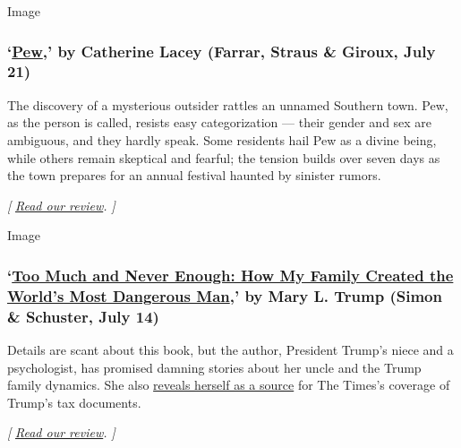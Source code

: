 Image

\hypertarget{pew-by-catherine-lacey-farrar-straus--giroux-july-21}{%
\subsubsection{\texorpdfstring{`\href{https://us.macmillan.com/books/9780374230920}{Pew},'
by Catherine Lacey (Farrar, Straus \& Giroux, July
21)}{`Pew,' by Catherine Lacey (Farrar, Straus \& Giroux, July 21)}}\label{pew-by-catherine-lacey-farrar-straus--giroux-july-21}}

The discovery of a mysterious outsider rattles an unnamed Southern town.
Pew, as the person is called, resists easy categorization --- their
gender and sex are ambiguous, and they hardly speak. Some residents hail
Pew as a divine being, while others remain skeptical and fearful; the
tension builds over seven days as the town prepares for an annual
festival haunted by sinister rumors.

\emph{{[}}
\href{https://www.nytimes.com/2020/07/13/books/review-pew-catherine-lacey.html}{\emph{Read
our review}}\emph{. {]}}

Image

\hypertarget{too-much-and-never-enough-how-my-family-created-the-worlds-most-dangerous-man-by-mary-l-trump-simon--schuster-july-14}{%
\subsubsection{\texorpdfstring{`\href{https://www.simonandschuster.com/books/Too-Much-and-Never-Enough/Mary-L-Trump/9781982141462}{Too
Much and Never Enough: How My Family Created the World's Most Dangerous
Man},' by Mary L. Trump (Simon \& Schuster, July
14)}{`Too Much and Never Enough: How My Family Created the World's Most Dangerous Man,' by Mary L. Trump (Simon \& Schuster, July 14)}}\label{too-much-and-never-enough-how-my-family-created-the-worlds-most-dangerous-man-by-mary-l-trump-simon--schuster-july-14}}

Details are scant about this book, but the author, President Trump's
niece and a psychologist, has promised damning stories about her uncle
and the Trump family dynamics. She also
\href{https://www.nytimes.com/2020/06/15/books/mary-trump-book.html}{reveals
herself as a source} for The Times's coverage of Trump's tax documents.

\emph{{[}}
\href{https://www.nytimes.com/2020/07/08/books/review-too-much-never-enough-mary-trump.html}{\emph{Read
our review}}\emph{. {]}}

